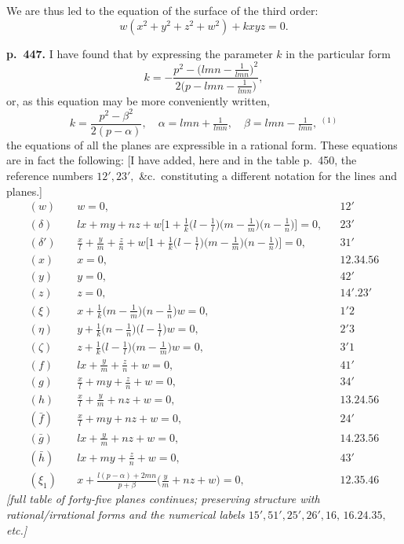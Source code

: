 \documentclass[11pt]{article}
\begin{document}
We are thus led to the equation of the surface of the third order:
\[ w(x^2 + y^2 + z^2 + w^2) + kxyz = 0. \]

\bigskip
\noindent\textbf{p.~447.} I have found that by expressing the parameter $k$ in the particular form
\[ k = -\frac{p^2 - \bigl(lmn - \tfrac{1}{lmn}\bigr)^2}{2\bigl(p - lmn - \tfrac{1}{lmn}\bigr)}, \]
or, as this equation may be more conveniently written,
\[ k = \frac{p^2 - \beta^2}{2(p - \alpha)},\quad \alpha = lmn + \tfrac{1}{lmn},\quad \beta = lmn - \tfrac{1}{lmn},\ ^{(1)} \]
the equations of all the planes are expressible in a rational form. These equations are in fact the following: [I have added, here and in the table p.~450, the reference numbers $12', 23',$ \&c.\ constituting a different notation for the lines and planes.]
\begin{align*}
(w)\quad & w = 0, & & 12'\\
(\delta)\quad & lx + my + nz + w\bigl[1 + \tfrac{1}{k}\bigl(l - \tfrac{1}{l}\bigr)\bigl(m - \tfrac{1}{m}\bigr)\bigl(n - \tfrac{1}{n}\bigr)\bigr] = 0, & & 23'\\
(\delta')\quad & \tfrac{x}{l} + \tfrac{y}{m} + \tfrac{z}{n} + w\bigl[1 + \tfrac{1}{k}\bigl(l - \tfrac{1}{l}\bigr)\bigl(m - \tfrac{1}{m}\bigr)\bigl(n - \tfrac{1}{n}\bigr)\bigr] = 0, & & 31'\\
(x)\quad & x = 0, & & 12.34.56\\
(y)\quad & y = 0, & & 42'\\
(z)\quad & z = 0, & & 14'.23'\\
(\xi)\quad & x + \tfrac{1}{k}\bigl(m - \tfrac{1}{m}\bigr)\bigl(n - \tfrac{1}{n}\bigr)w = 0, & & 1'2\\
(\eta)\quad & y + \tfrac{1}{k}\bigl(n - \tfrac{1}{n}\bigr)\bigl(l - \tfrac{1}{l}\bigr)w = 0, & & 2'3\\
(\zeta)\quad & z + \tfrac{1}{k}\bigl(l - \tfrac{1}{l}\bigr)\bigl(m - \tfrac{1}{m}\bigr)w = 0, & & 3'1\\
(f)\quad & lx + \tfrac{y}{m} + \tfrac{z}{n} + w = 0, & & 41'\\
(g)\quad & \tfrac{x}{l} + my + \tfrac{z}{n} + w = 0, & & 34'\\
(h)\quad & \tfrac{x}{l} + \tfrac{y}{m} + nz + w = 0, & & 13.24.56\\
(\bar{f})\quad & \tfrac{x}{l} + my + nz + w = 0, & & 24'\\
(\bar{g})\quad & lx + \tfrac{y}{m} + nz + w = 0, & & 14.23.56\\
(\bar{h})\quad & lx + my + \tfrac{z}{n} + w = 0, & & 43'\\
(\xi_1)\quad & x + \tfrac{l(p-\alpha) + 2mn}{p + \beta}\bigl(\tfrac{y}{m} + nz + w\bigr) = 0, & & 12.35.46
\end{align*}
\textit{[full table of forty-five planes continues; preserving structure with rational/irrational forms and the numerical labels $15', 51', 25', 26', 16,\,16.24.35,$ etc.]}
\end{document}
